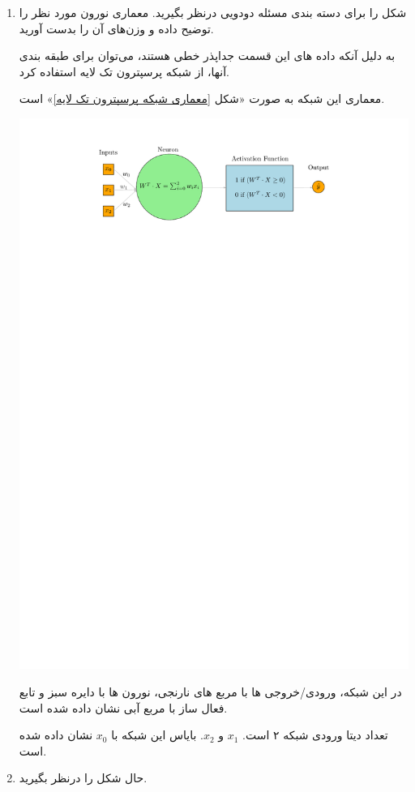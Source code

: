 \begin{enumerate}
	\item شکل  را برای دسته بندی مسئله دودویی درنظر بگیرید. معماری نورون مورد نظر را توضیح داده و وزن‌های آن را بدست آورید.
	
	\begin{qsolve}
		به دلیل آنکه داده های این قسمت جداپذر خطی هستند، می‌توان برای طبقه بندی آنها، از شبکه پرسپترون تک لایه استفاده کرد.
		
		معماری این شبکه به صورت «شکل \ref{معماری شبکه پرسپترون تک لایه}» است.
		
		
		\begin{center}
			\includegraphics*[width=0.8\linewidth]{pics/img2.pdf}
			\label{معماری شبکه پرسپترون تک لایه}
		\end{center}
	\end{qsolve}
	
	\begin{qsolve}
				در این شبکه، ورودی/خروجی ها با مربع های نارنجی، نورون ها با دایره سبز و تابع فعال ساز با مربع آبی نشان داده شده است.
		
		تعداد دیتا ورودی شبکه ۲ است. $x_1$ و $x_2$. بایاس این شبکه با $x_0$ نشان داده شده است.
	\end{qsolve}
	
	
	
	
	
	
	
	
	
	
	
	
	
	
	
	
	
	
	
	\item حال شکل  را درنظر بگیرید.
\end{enumerate}
